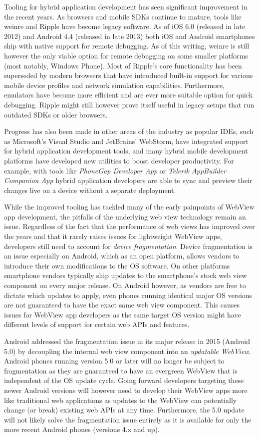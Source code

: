 \documentclass[thesis.tex]{subfiles}
\begin{document}
Tooling for hybrid application development has seen significant improvement in the recent years. As browsers and mobile SDKs continue to mature, tools like weinre and Ripple have become legacy software. As of iOS 6.0 (released in late 2012) and Android 4.4 (released in late 2013) both iOS and Android smartphones ship with native support for remote debugging. As of this writing, weinre is still however the only viable option for remote debugging on some smaller platforms (most notably, Windows Phone). Most of Ripple's core functionality has been superseded by modern browsers that have introduced built-in support for various mobile device profiles and network simulation capabilities. Furthermore, emulators have become more efficient and are ever more suitable option for quick debugging. Ripple might still however prove itself useful in legacy setups that run outdated SDKs or older browsers.

Progress has also been made in other areas of the industry as popular IDEs, such as Microsoft's Visual Studio and JetBrains' WebStorm, have integrated support for hybrid application development tools, and many hybrid mobile development platforms have developed new utilities to boost developer productivity. For example, with tools like \textit{PhoneGap Developer App} or \textit{Telerik AppBuilder Companion App} hybrid application developers are able to sync and preview their changes live on a device without a separate deployment.

While the improved tooling has tackled many of the early painpoints of WebView app development, the pitfalls of the underlying web view technology remain an issue. Regardless of the fact that the performance of web views has improved over the years and that it rarely raises issues for lightweight WebView apps, developers still need to account for \textit{device fragmentation}. Device fragmentation is an issue especially on Android, which as an open platform, allows vendors to introduce their own modifications to the OS software. On other platforms smartphone vendors typically ship updates to the smartphone's stock web view component on every major release. On Android however, as vendors are free to dictate which updates to apply, even phones running identical major OS versions are not guaranteed to have the exact same web view component. This causes issues for WebView app developers as the same target OS version might have different levels of support for certain web APIs and features.

Android addressed the fragmentation issue in its major release in 2015 (Android 5.0) by decoupling the internal web view component into an \textit{updatable WebView}. Android phones running version 5.0 or later will no longer be subject to fragmentation as they are guaranteed to have an evergreen WebView that is independent of the OS update cycle. Going forward developers targeting these newer Android versions will however need to develop their WebView apps more like traditional web applications as updates to the WebView can potentially change (or break) existing web APIs at any time. Furthermore, the 5.0 update will not likely solve the fragmentation issue entirely as it is available for only the more recent Android phones (versions 4.x and up).
\end{document}
